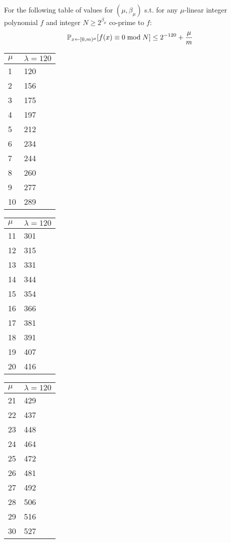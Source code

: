    \begin{lemma} \label{lem:cCSZ}
For the following table of values for $( \mu, \beta_\mu)$ s.t. for any $\mu$-linear integer polynomial $f$ and integer $N \geq 2^{\beta_\mu}$ co-prime to $f$: 
 $$\mathbb{P}_{x\gets [0,m)^\mu} [f(x)\equiv 0 \bmod N]\leq 2^{-120}+\frac{\mu}{m}$$
\begin{mdframed}
 \begin{center}

\begin{tabular}{l||l}

$\mu$ &  $\lambda=120$ \\
\hline
\hline
1 & 120\\
2 & 156\\
3 & 175\\
4 & 197\\
5 & 212\\
6 & 234\\
7 & 244\\
8 & 260\\
9 & 277\\
10 & 289\\

\end{tabular}
\begin{tabular}{l||l}

$\mu$ &  $\lambda=120$ \\
\hline
\hline
11 & 301\\
12 & 315\\
13 & 331\\
14 & 344\\
15 & 354\\
16 & 366\\
17 & 381\\
18 & 391\\
19 & 407\\
20 & 416\\
\end{tabular}
\begin{tabular}{l||l}

$\mu$ &  $\lambda=120$ \\
\hline
\hline
21 & 429\\
22 & 437\\
23 & 448\\
24 & 464\\
25 & 472\\
26 & 481\\
27 & 492\\
28 & 506\\
29 & 516\\
30 & 527\\

\end{tabular}
\end{center}	
\end{mdframed}
 \end{lemma} 

